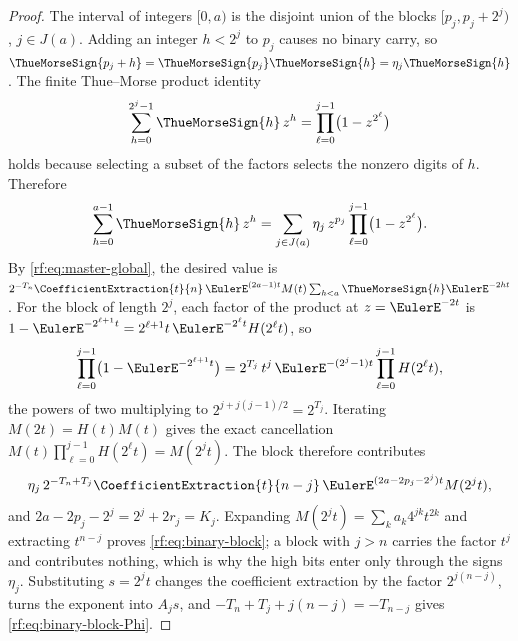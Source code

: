 \documentclass[11pt,oneside]{article}
\theoremstyle{plain}
\theoremstyle{definition}
\theoremstyle{remark}
\newcommand{\tm}[1]{\ThueMorseSign{#1}}     %
\newcommand{\coeff}[2]{\CoefficientExtraction{#1}{#2}}
\newcommand{\Tr}[1]{T_{#1}}                 %
\begin{document}
\begin{proof}
The interval of integers $[0,a)$ is the disjoint union of the blocks
$[p_{j},p_{j}+2^{j})$, $j\in J(a)$.  Adding an integer $h<2^{j}$ to $p_{j}$
causes no binary carry, so $\tm{p_{j}+h}=\tm{p_{j}}\tm{h}=\eta_{j}\tm{h}$.
The finite Thue--Morse product identity
\begin{equation}
 \sum_{h=0}^{2^{j}-1}\tm{h}\,z^{h}=\prod_{\ell=0}^{j-1}\bigl(1-z^{2^{\ell}}\bigr)
 \label{rf:eq:binary-tm-product}
\end{equation}
holds because selecting a subset of the factors selects the nonzero digits
of $h$.  Therefore
\begin{equation}
 \sum_{h=0}^{a-1}\tm{h}\,z^{h}
 =\sum_{j\in J(a)}\eta_{j}\,z^{p_{j}}\prod_{\ell=0}^{j-1}\bigl(1-z^{2^{\ell}}\bigr).
 \label{rf:eq:binary-prefix-product}
\end{equation}
By \cref{rf:eq:master-global}, the desired value is
$2^{-\Tr{n}}\coeff{t}{n}\,\EulerE^{(2a-1)t}M(t)\sum_{h<a}\tm{h}\EulerE^{-2ht}$.
For the block of length $2^{j}$, each factor of the product at
$z=\EulerE^{-2t}$ is
$1-\EulerE^{-2^{\ell+1}t}=2^{\ell+1}t\,\EulerE^{-2^{\ell}t}H(2^{\ell}t)$, so
\begin{equation}
 \prod_{\ell=0}^{j-1}\bigl(1-\EulerE^{-2^{\ell+1}t}\bigr)
 =2^{\Tr{j}}\,t^{j}\,\EulerE^{-(2^{j}-1)t}\prod_{\ell=0}^{j-1}H(2^{\ell}t),
 \label{rf:eq:binary-H-product}
\end{equation}
the powers of two multiplying to $2^{j+j(j-1)/2}=2^{\Tr{j}}$.  Iterating
$M(2t)=H(t)M(t)$ gives the exact cancellation
$M(t)\prod_{\ell=0}^{j-1}H(2^{\ell}t)=M(2^{j}t)$.  The block therefore
contributes
\[
 \eta_{j}\,2^{-\Tr{n}+\Tr{j}}\coeff{t}{n-j}\,\EulerE^{(2a-2p_{j}-2^{j})t}M(2^{j}t),
\]
and $2a-2p_{j}-2^{j}=2^{j}+2r_{j}=K_{j}$.  Expanding
$M(2^{j}t)=\sum_{k}a_{k}4^{jk}t^{2k}$ and extracting $t^{n-j}$ proves
\cref{rf:eq:binary-block}; a block with $j>n$ carries the factor $t^{j}$ and
contributes nothing, which is why the high bits enter only through the signs
$\eta_{j}$.  Substituting $s=2^{j}t$ changes the coefficient extraction by
the factor $2^{j(n-j)}$, turns the exponent into $A_{j}s$, and
$-\Tr{n}+\Tr{j}+j(n-j)=-\Tr{n-j}$ gives \cref{rf:eq:binary-block-Phi}.
\end{proof}
\end{document}
